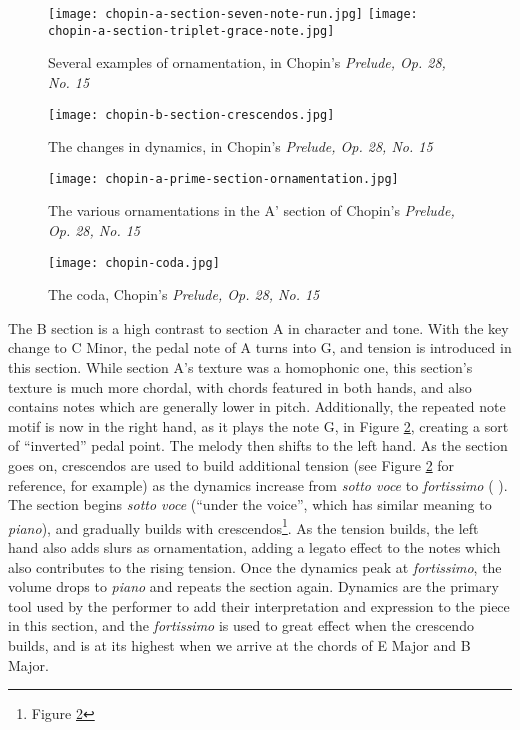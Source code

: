\begin{figure}[h]
  \centering
  \texttt{[image: chopin-a-section-seven-note-run.jpg]}
  \texttt{[image: chopin-a-section-triplet-grace-note.jpg]}
  \caption{Several examples of ornamentation, in Chopin's \textit{Prelude, Op. 28, No. 15}}
  \label{fig:chopin-a-section-examples-ornamentation}
\end{figure}

\begin{figure}
  \centering
  \texttt{[image: chopin-b-section-crescendos.jpg]}
  \caption{The changes in dynamics, in Chopin's \textit{Prelude, Op. 28, No. 15}}
  \label{fig:chopin-b-section-crescendos}
\end{figure}

\begin{figure}
  \centering
  \texttt{[image: chopin-a-prime-section-ornamentation.jpg]}
  \caption[Ornamentations in A', Chopin's \textit{Prelude, Op. 28, No. 15}]{The various ornamentations in the A' section of Chopin's \textit{Prelude, Op. 28, No. 15}}
  \label{fig:chopin-a-prime-section-ornamentation}
\end{figure}

\begin{figure}
  \centering
  \texttt{[image: chopin-coda.jpg]}
  \caption{The coda, Chopin's \textit{Prelude, Op. 28, No. 15}}
  \label{fig:chopin-coda}
\end{figure}



The B section is a high contrast to section A in character and tone. With the key change to C\musSharp{} Minor, the pedal note of A\musFlat{} turns into G\musSharp{}, and tension is introduced in this section. While section A's texture was a homophonic one, this section's texture is much more chordal, with chords featured in both hands, and also contains notes which are generally lower in pitch. Additionally, the repeated note motif is now in the right hand, as it plays the note G\musSharp{}, in Figure \ref{fig:chopin-b-section-crescendos}\autocite{Hansen_1973}, creating a sort of ``inverted'' pedal point. The melody then shifts to the left hand. As the section goes on, crescendos are used to build additional tension (see Figure \ref{fig:chopin-b-section-crescendos}\autocite{Hansen_1973} for reference, for example) as the dynamics increase from \textit{sotto voce} to \textit{fortissimo} ( ). The section begins \textit{sotto voce} (``under the voice'', which has similar meaning to \textit{piano}), and gradually builds with crescendos\footnote{Figure \ref{fig:chopin-b-section-crescendos}}\autocite{Hansen_1973}. As the tension builds, the left hand also adds slurs as ornamentation, adding a legato effect to the notes which also contributes to the rising tension. Once the dynamics peak at \textit{fortissimo}, the volume drops to \textit{piano} and repeats the section again. Dynamics are the primary tool used by the performer to add their interpretation and expression to the piece in this section, and the \textit{fortissimo} is used to great effect when the crescendo builds, and is at its highest when we arrive at the chords of E Major and B Major.

